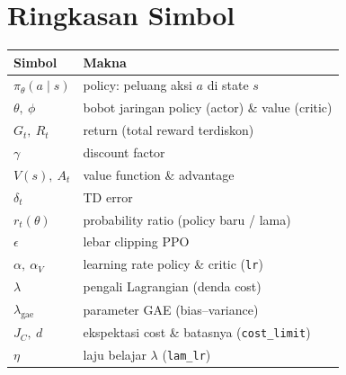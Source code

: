 \documentclass[11pt,a4paper]{article}
\begin{document}
\section{Ringkasan Simbol}
\begin{center}
\begin{tabular}{ll}
\hline
\textbf{Simbol} & \textbf{Makna} \\
\hline
$\pi_\theta(a\mid s)$ & policy: peluang aksi $a$ di state $s$ \\
$\theta,\ \phi$       & bobot jaringan policy (actor) \& value (critic) \\
$G_t,\ R_t$           & return (total reward terdiskon) \\
$\gamma$              & discount factor \\
$V(s),\ A_t$          & value function \& advantage \\
$\delta_t$            & TD error \\
$r_t(\theta)$         & probability ratio (policy baru / lama) \\
$\epsilon$            & lebar clipping PPO \\
$\alpha,\ \alpha_V$   & learning rate policy \& critic (\texttt{lr}) \\
$\lambda$             & pengali Lagrangian (denda cost) \\
$\lambda_{\mathrm{gae}}$ & parameter GAE (bias--variance) \\
$J_C,\ d$             & ekspektasi cost \& batasnya (\texttt{cost\_limit}) \\
$\eta$                & laju belajar $\lambda$ (\texttt{lam\_lr}) \\
\hline
\end{tabular}
\end{center}
\end{document}
